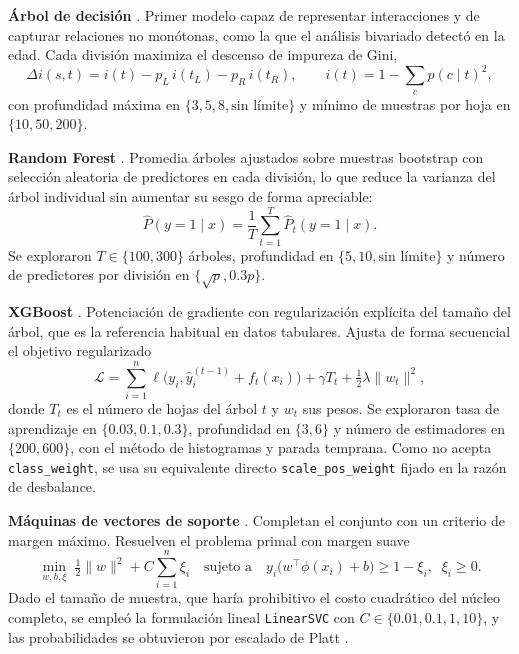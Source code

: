 \documentclass[pdflatex,sn-mathphys-num]{sn-jnl}
\begin{document}
\textbf{Árbol de decisión} \cite{bib_breiman_cart}. Primer modelo capaz de representar interacciones y de capturar relaciones no monótonas, como la que el análisis bivariado detectó en la edad. Cada división maximiza el descenso de impureza de Gini,
\begin{equation}
\Delta i(s,t) = i(t) - p_L\,i(t_L) - p_R\,i(t_R),
\qquad i(t) = 1 - \sum_{c} p(c\mid t)^2,
\label{eq:arbol}
\end{equation}
con profundidad máxima en $\{3, 5, 8, \text{sin límite}\}$ y mínimo de muestras por hoja en $\{10, 50, 200\}$.

\textbf{Random Forest} \cite{bib_breiman_rf}. Promedia árboles ajustados sobre muestras bootstrap con selección aleatoria de predictores en cada división, lo que reduce la varianza del árbol individual sin aumentar su sesgo de forma apreciable:
\begin{equation}
\hat{P}(y=1\mid x) = \frac{1}{T}\sum_{t=1}^{T} \hat{P}_t(y=1\mid x).
\label{eq:rf}
\end{equation}
Se exploraron $T \in \{100, 300\}$ árboles, profundidad en $\{5, 10, \text{sin límite}\}$ y número de predictores por división en $\{\sqrt{p}, 0.3p\}$.

\textbf{XGBoost} \cite{bib_chen}. Potenciación de gradiente con regularización explícita del tamaño del árbol, que es la referencia habitual en datos tabulares. Ajusta de forma secuencial el objetivo regularizado
\begin{equation}
\mathcal{L} = \sum_{i=1}^{n} \ell\big(y_i, \hat{y}_i^{(t-1)} + f_t(x_i)\big) + \gamma T_t + \tfrac{1}{2}\lambda\lVert w_t\rVert^2,
\label{eq:xgb}
\end{equation}
donde $T_t$ es el número de hojas del árbol $t$ y $w_t$ sus pesos. Se exploraron tasa de aprendizaje en $\{0.03, 0.1, 0.3\}$, profundidad en $\{3, 6\}$ y número de estimadores en $\{200, 600\}$, con el método de histogramas y parada temprana. Como no acepta \texttt{class\_weight}, se usa su equivalente directo \texttt{scale\_pos\_weight} fijado en la razón de desbalance.

\textbf{Máquinas de vectores de soporte} \cite{bib_cortes}. Completan el conjunto con un criterio de margen máximo. Resuelven el problema primal con margen suave
\begin{equation}
\min_{w,b,\xi} \; \tfrac{1}{2}\lVert w\rVert^2 + C\sum_{i=1}^{n}\xi_i
\quad \text{sujeto a} \quad y_i\big(w^\top\phi(x_i)+b\big) \geq 1-\xi_i, \;\; \xi_i \geq 0.
\label{eq:svm}
\end{equation}
Dado el tamaño de muestra, que haría prohibitivo el costo cuadrático del núcleo completo, se empleó la formulación lineal \texttt{LinearSVC} con $C \in \{0.01, 0.1, 1, 10\}$, y las probabilidades se obtuvieron por escalado de Platt \cite{bib_platt}.
\end{document}
